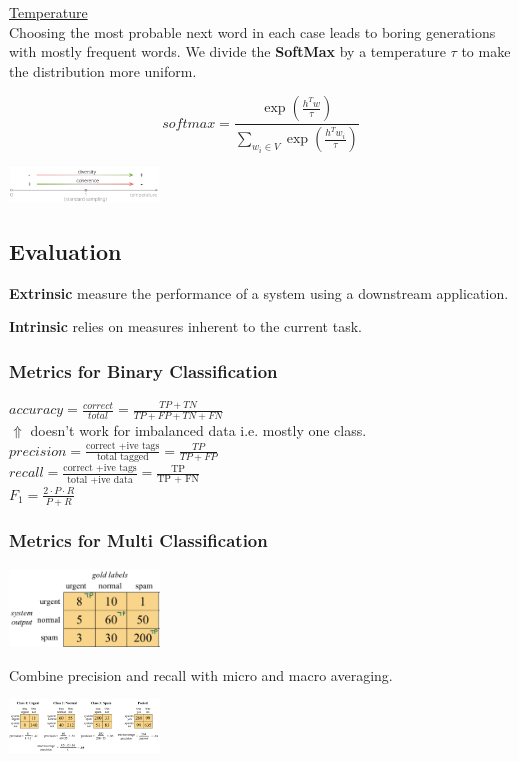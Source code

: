 \documentclass[8pt]{extarticle} %
\begin{document}
\begin{multicols*}{3}
\underline{Temperature}\\
Choosing the most probable next word in each case leads to boring generations with mostly frequent words. 
We divide the \textbf{SoftMax} by a temperature $\tau$ to make the distribution more uniform.

$$softmax = \frac{\exp \left(\frac{h^T w}{\tau}\right)}{\sum_{w_i \in V} \exp \left(\frac{h^T w_i}{\tau}\right)}$$
\begin{center}
    \includegraphics[width=0.3\textwidth]{media/diversity.png}
\end{center}

\subsection*{Evaluation}
\textbf{Extrinsic} measure the performance of a system using a downstream application.

\textbf{Intrinsic} relies on measures inherent to the current task.

\subsubsection*{Metrics for Binary Classification}
${accuracy}=\frac{correct}{total}=\frac{TP+TN}{TP+FP+TN+FN}$\\
$\Uparrow$ doesn't work for imbalanced data i.e. mostly one class.\\
${precision}=\frac{\text{correct +ive tags}}{\text{total tagged}}=\frac{T P}{T P+F P}$\\
${recall}= \frac{\text{correct +ive tags}}{\text{total +ive data}}=\frac{\text{TP}}{\text{TP + FN}}$\\
$F_1=\frac{2 \cdot P \cdot R}{P+R}$

\subsubsection{Metrics for Multi Classification}
\begin{center}
    \includegraphics[width=0.3\textwidth]{media/confusion-matrix.png}
\end{center}
Combine precision and recall with micro and macro averaging.
\begin{center}
    \includegraphics[width=0.3\textwidth]{media/micromacro-averaging.png}
\end{center}


\end{multicols*}
\end{document}

